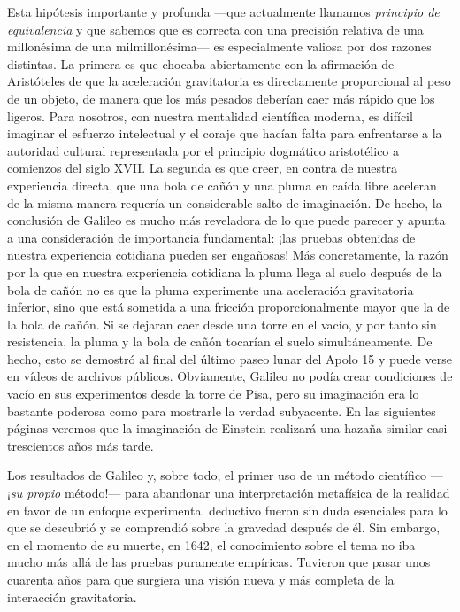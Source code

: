 Esta hipótesis importante y profunda ---que actualmente llamamos \emph{principio de
equivalencia} y que
sabemos que es correcta con una precisión relativa de una millonésima de una
milmillonésima--- es especialmente valiosa por dos razones distintas. La primera
es que chocaba abiertamente con la afirmación de Aristóteles de que la aceleración
gravitatoria es directamente proporcional al peso de un objeto, de manera que los
más pesados deberían caer más rápido que los ligeros. Para nosotros, con nuestra
mentalidad científica moderna, es difícil imaginar el esfuerzo intelectual y el
coraje que hacían falta para enfrentarse a la autoridad cultural representada por
el principio dogmático aristotélico a comienzos del siglo XVII. La segunda es que
creer, en contra de nuestra experiencia directa, que una bola de cañón y una pluma
en caída libre aceleran de la misma manera requería
un considerable salto de imaginación. De hecho, la conclusión de Galileo es mucho
más reveladora de lo que puede parecer y apunta a una consideración de importancia
fundamental: ¡las pruebas obtenidas de nuestra experiencia cotidiana pueden ser
engañosas! Más concretamente, la razón por la que en nuestra experiencia cotidiana
la pluma llega al suelo después de la bola de cañón no es que la pluma experimente
una aceleración gravitatoria inferior, sino que está sometida a una fricción
proporcionalmente mayor que la de la bola de cañón. Si se dejaran caer desde una
torre en el vacío, y por tanto sin resistencia, la pluma y la bola
de cañón tocarían el suelo simultáneamente. De hecho, esto se demostró al final del
último paseo lunar del Apolo 15 y puede verse en vídeos de archivos públicos.
Obviamente, Galileo no podía crear condiciones de vacío en sus experimentos desde
la torre de Pisa, pero su imaginación era lo bastante poderosa como para mostrarle
la verdad subyacente. En las siguientes páginas veremos que la imaginación de
Einstein realizará una hazaña similar casi trescientos años más tarde.

Los resultados de Galileo y, sobre todo, el primer uso de un método
científico ---¡\emph{su propio} método!---
para abandonar una interpretación metafísica de la realidad en favor de un enfoque
experimental deductivo fueron sin duda esenciales para lo que se descubrió y se
comprendió sobre la gravedad después de él. Sin embargo, en el momento de su muerte,
en 1642, el conocimiento sobre el tema no iba mucho más allá de las pruebas puramente
empíricas. Tuvieron que pasar unos cuarenta años para que surgiera una visión nueva
y más completa de la interacción gravitatoria.

